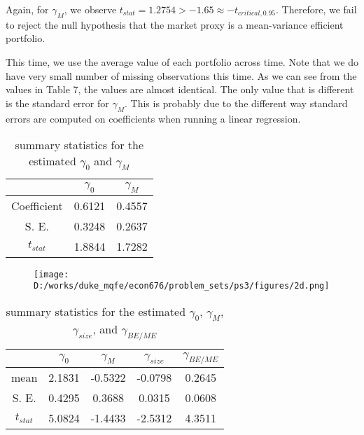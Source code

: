 \documentclass{report}
\begin{document}
Again, for $\gamma_M$, we observe $t_{stat} = 1.2754 > -1.65 \approx -t_{critical, 0.95}$. Therefore, we fail to reject the null hypothesis that the market proxy is a mean-variance efficient portfolio.


This time, we use the average value of each portfolio across time. Note that we do have very small number of missing observations this time. As we can see from the values in Table 7, the values are almost identical. The only value that is different is the standard error for $\gamma_M$. This is probably due to the different way standard errors are computed on coefficients when running a linear regression.

\begin{table}[ht]
\centering
\caption{summary statistics for the estimated $\gamma_0$ and $\gamma_M$}
\begin{tabular}{c | c | c}
		& $\gamma_0$	& $\gamma_M$	\\	[0.5ex] 	\hline
Coefficient	& 0.6121		& 0.4557		\\
S. E.		& 0.3248		& 0.2637		\\
$t_{stat}$	& 1.8844		& 1.7282		\\ 	[0.5ex]	\hline \hline
\end{tabular}
\end{table}



\begin{figure}[h]
	\centering
	\caption{ }
	\texttt{[image: D:/works/duke\_mqfe/econ676/problem\_sets/ps3/figures/2d.png]}
\end{figure}



\begin{table}[ht]
\centering
\caption{summary statistics for the estimated $\gamma_0$, $\gamma_M$, $\gamma_{size}$, and $\gamma_{BE/ME}$}
\begin{tabular}{c | c | c | c | c}
		& $\gamma_0$	& $\gamma_M$	& $\gamma_{size}$	& $\gamma_{BE/ME}$	\\	[0.5ex] 	\hline
mean	& 2.1831		& -0.5322		& -0.0798			& 0.2645				\\
S. E.		& 0.4295		& 0.3688		& 0.0315			& 0.0608				\\
$t_{stat}$	& 5.0824		& -1.4433		& -2.5312			& 4.3511				\\ 	[0.5ex]	\hline \hline
\end{tabular}
\end{table}
\end{document}
